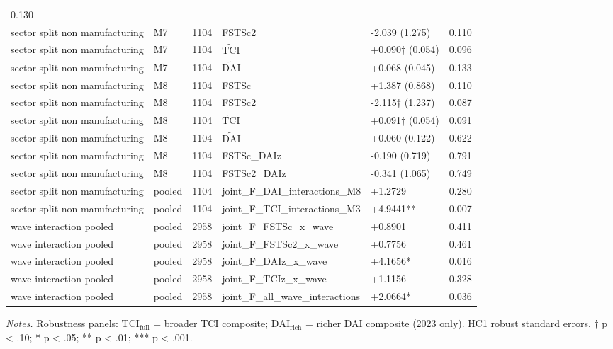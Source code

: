 \documentclass[12pt,a4paper]{article}
\begin{document}
\begin{longtable}[]{@{}llllll@{}}
0.130 \\
sector split non manufacturing & M7 & 1104 & FSTSc2 & -2.039 (1.275) &
0.110 \\
sector split non manufacturing & M7 & 1104 & \(\tilde{\mathrm{TCI}}\) &
+0.090† (0.054) & 0.096 \\
sector split non manufacturing & M7 & 1104 & \(\tilde{\mathrm{DAI}}\) &
+0.068 (0.045) & 0.133 \\
sector split non manufacturing & M8 & 1104 & FSTSc & +1.387 (0.868) &
0.110 \\
sector split non manufacturing & M8 & 1104 & FSTSc2 & -2.115† (1.237) &
0.087 \\
sector split non manufacturing & M8 & 1104 & \(\tilde{\mathrm{TCI}}\) &
+0.091† (0.054) & 0.091 \\
sector split non manufacturing & M8 & 1104 & \(\tilde{\mathrm{DAI}}\) &
+0.060 (0.122) & 0.622 \\
sector split non manufacturing & M8 & 1104 & FSTSc\_DAIz & -0.190
(0.719) & 0.791 \\
sector split non manufacturing & M8 & 1104 & FSTSc2\_DAIz & -0.341
(1.065) & 0.749 \\
sector split non manufacturing & pooled & 1104 &
joint\_F\_DAI\_interactions\_M8 & +1.2729 & 0.280 \\
sector split non manufacturing & pooled & 1104 &
joint\_F\_TCI\_interactions\_M3 & +4.9441** & 0.007 \\
wave interaction pooled & pooled & 2958 & joint\_F\_FSTSc\_x\_wave &
+0.8901 & 0.411 \\
wave interaction pooled & pooled & 2958 & joint\_F\_FSTSc2\_x\_wave &
+0.7756 & 0.461 \\
wave interaction pooled & pooled & 2958 & joint\_F\_DAIz\_x\_wave &
+4.1656* & 0.016 \\
wave interaction pooled & pooled & 2958 & joint\_F\_TCIz\_x\_wave &
+1.1156 & 0.328 \\
wave interaction pooled & pooled & 2958 &
joint\_F\_all\_wave\_interactions & +2.0664* & 0.036 \\
\end{longtable}

\emph{Notes.} Robustness panels: \(\mathrm{TCI}_{\text{full}}\) =
broader TCI composite; \(\mathrm{DAI}_{\text{rich}}\) = richer DAI
composite (2023 only). HC1 robust standard errors. † p \textless{} .10;
* p \textless{} .05; ** p \textless{} .01; *** p \textless{} .001.
\end{document}
